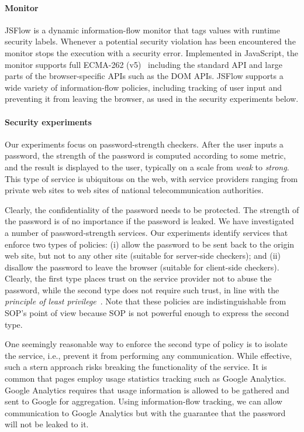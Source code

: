 \documentclass{llncs}
\begin{document}
\paragraph{Monitor}

JSFlow is a dynamic information-flow monitor that tags values with runtime
security labels. Whenever a potential security
violation has been encountered the monitor stops the execution with a security
error. Implemented in JavaScript, the monitor supports
full 
ECMA-262 (v5)~\cite{ecma:262:5} including the standard API and large parts of the
browser-specific APIs such as the DOM APIs. 
JSFlow supports a wide variety of information-flow policies,
including tracking of user input and preventing it from leaving the
browser, as used in
the security experiments below.

\paragraph{Security experiments}
Our experiments focus on password-strength checkers. 
After the user inputs a password, the strength of the password is computed according
to some metric, and the result is displayed to the user, typically on a scale
from \emph{weak} to \emph{strong}. This type of service is ubiquitous
on the web, with service providers ranging from private web sites to web sites
of national telecommunication authorities.

Clearly, the confidentiality of the password needs to be protected.  The
strength of the password is of no importance if the password is leaked.  We
have investigated a number of password-strength services. 
Our experiments identify services that enforce two types of policies: (i)
allow the password to be sent back to the origin web site, but not to
any other site (suitable for server-side checkers); and (ii) disallow the password
to leave the browser (suitable for client-side checkers). 
Clearly, the first type places trust on the service provider not to
abuse the password, while the second type does not require such trust,
in line with the \emph{principle of least
privilege}~\cite{Saltzer:Schroeder:TCB}.
Note that these policies are indistinguishable from SOP's point of
view because SOP is not powerful enough to express the second type.

One seemingly reasonable way to enforce the second type of policy is to
isolate the service, i.e., prevent it from performing any communication.
While effective, such a stern approach risks breaking the functionality of the service.
It is common that pages employ usage statistics tracking such as Google
Analytics. Google Analytics requires that usage information is allowed to be gathered and
sent to Google for aggregation. Using information-flow tracking, we
can allow communication to Google Analytics but with the guarantee
that the password will not be leaked to it.
\end{document}
